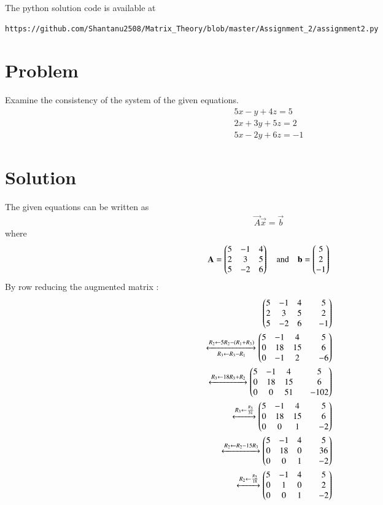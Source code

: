 \documentclass[journal,12pt,twocolumn]{IEEEtran}
\begin{document}
The python solution code is available at
\begin{lstlisting}
https://github.com/Shantanu2508/Matrix_Theory/blob/master/Assignment_2/assignment2.py
\end{lstlisting}
%
\section{Problem}
Examine the consistency of the system of the given equations.
\begin{align}
	5x -  y + 4z = 5 \nonumber \\
	2x + 3y + 5z = 2 \\
	5x - 2y + 6z =-1 \nonumber
\end{align}

\section{Solution}
	The given equations can be written as
\begin{align*}
	\vec{A} \vec{x} = \vec{b}  
\end{align*}
where
\begin{align}
	\mathbf{A} = \begin{pmatrix} 5 & -1 & 4 \\ 2 &  3 & 5 \\ 5 & -2 & 6 \end{pmatrix}
	\quad \text{and} \quad
	\mathbf{b} = \begin{pmatrix} 5 \\  2 \\ -1\end{pmatrix}
\end{align}
By row reducing the augmented matrix :
\begin{align}
	\begin{pmatrix} 5 & -1 & 4 & & 5 \\ 2 & 3 & 5 & & 2 \\ 5 & -2 & 6 & & -1\end{pmatrix}
	\\
	\xleftrightarrow[R_3 \leftarrow R_3-R_1]{R_2 \leftarrow 5R_2-(R_1+R_3)}
	\begin{pmatrix}5 &-1  & 4  & & 5 \\ 0 & 18 & 15 & & 6 \\ 0 & -1 & 2 & & -6\end{pmatrix}
	\\
	\xleftrightarrow[]{R_3 \leftarrow 18R_3+R_2}
	\begin{pmatrix}5 & -1 &  4 & & 5 \\ 0 & 18 & 15 & & 6 \\ 0 & 0 & 51 & & -102\end{pmatrix}
	\\
	\xleftrightarrow[]{R_3 \leftarrow \frac{R_3}{51}}
	\begin{pmatrix}5 & -1 &  4 & & 5 \\ 0 & 18 & 15 & & 6 \\ 0 & 0 & 1 & & -2\end{pmatrix}
	\\
	\xleftrightarrow[]{R_2 \leftarrow R_2-15 R_3}
	\begin{pmatrix}5 & -1 &  4 & & 5 \\ 0 & 18 & 0 & & 36 \\ 0 & 0 & 1 & & -2\end{pmatrix}
	\\
	\xleftrightarrow[]{R_2 \leftarrow \frac{R_2}{18}}
	\begin{pmatrix}5 & -1 &  4 & & 5 \\ 0 & 1 & 0 & & 2 \\ 0 & 0 & 1 & & -2\end{pmatrix}
\end{align}
\end{document}
